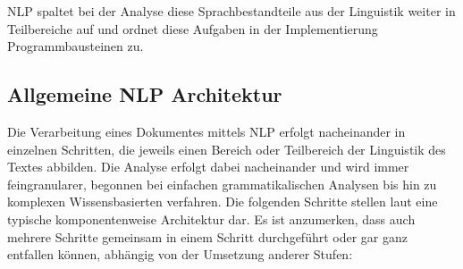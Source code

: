 \documentclass[12pt]{report}
\begin{document}
NLP spaltet bei der Analyse diese Sprachbestandteile aus der Linguistik weiter in Teilbereiche auf und ordnet diese Aufgaben in der Implementierung Programmbausteinen zu.

\subsection{Allgemeine NLP Architektur}
Die Verarbeitung eines Dokumentes mittels NLP erfolgt nacheinander in einzelnen Schritten, die jeweils einen Bereich oder Teilbereich der Linguistik des Textes abbilden. Die Analyse erfolgt dabei nacheinander und wird immer feingranularer, begonnen bei einfachen grammatikalischen Analysen bis hin zu komplexen Wissensbasierten verfahren. Die folgenden Schritte stellen laut \cite{cop04} eine typische komponentenweise Architektur dar. Es ist anzumerken, dass auch mehrere Schritte gemeinsam in einem Schritt durchgeführt oder gar ganz entfallen können, abhängig von der Umsetzung anderer Stufen:
\end{document}
